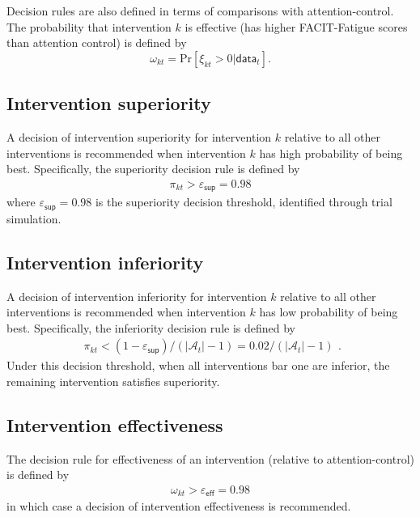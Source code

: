 \documentclass[
]{article}
\begin{document}
Decision rules are also defined in terms of comparisons with attention-control. 
The probability that intervention $k$ is effective (has higher FACIT-Fatigue scores than attention control) is defined by
$$
  \omega_{kt} = \text{Pr}[\xi_{kt} > 0 | \mathsf{data}_t].
$$

\hypertarget{intervention-superiority}{%
  \subsection{Intervention superiority}\label{intervention-superiority}}

A decision of intervention superiority for intervention $k$ relative to all other interventions is recommended when intervention $k$ has high probability of being best.
Specifically, the superiority decision rule is defined by
$$
  \begin{aligned}
    \pi_{kt} > \varepsilon_{\mathsf{sup}} = 0.98
  \end{aligned}
$$
where $\varepsilon_{\mathsf{sup}} = 0.98$ is the superiority decision threshold, identified through trial simulation.

\hypertarget{intervention-inferiority}{%
  \subsection{Intervention inferiority}\label{trinterventioneatment-inferiority}}

A decision of intervention inferiority for intervention $k$ relative to all other interventions is recommended when intervention $k$ has low probability of being best.
Specifically, the inferiority decision rule is defined by
$$
  \begin{aligned}
    \pi_{kt} < (1 - \varepsilon_{\mathsf{sup}}) / (|\mathcal{A}_t| - 1) = 0.02 / (|\mathcal{A}_t| - 1)
  \end{aligned}.
$$
Under this decision threshold, when all interventions bar one are inferior, the remaining intervention satisfies superiority.

\hypertarget{intervention-effectiveness}{%
  \subsection{Intervention effectiveness}\label{intervention-effectiveness}}

The decision rule for effectiveness of an intervention (relative to attention-control) is defined by
$$
  \begin{aligned}
    \omega_{kt} > \varepsilon_{\mathsf{eff}} = 0.98
  \end{aligned}
$$
in which case a decision of intervention effectiveness is recommended.
\end{document}
